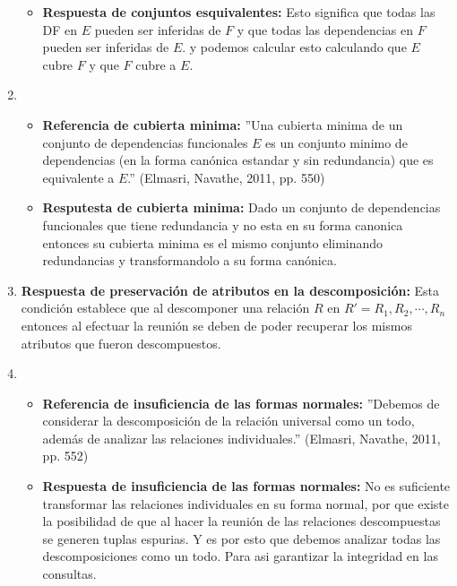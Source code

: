\documentclass[twoside]{article}
\begin{document}
\begin{enumerate}
\begin{itemize}
                  \item \textbf{Respuesta de conjuntos esquivalentes:} Esto significa que todas las DF en $E$ pueden ser inferidas de $F$ y que todas las dependencias en $F$ pueden ser
                        inferidas de $E$. y podemos calcular esto calculando que $E$ cubre $F$ y que $F$ cubre a $E$.
            \end{itemize}
      \item
            \begin{itemize}
                  \item \textbf{Referencia de cubierta minima:} ''Una cubierta minima de un conjunto de dependencias funcionales $E$ es un conjunto minimo de dependencias (en
                        la forma can\'onica estandar y sin redundancia) que es equivalente a $E$.'' (Elmasri, Navathe, 2011, pp. 550)
                  \item \textbf{Resputesta de cubierta minima:} Dado un conjunto de dependencias funcionales que tiene redundancia y no esta en su forma canonica entonces su cubierta minima
                        es el mismo conjunto eliminando redundancias y transformandolo a su forma can\'onica.
            \end{itemize}
      \item \textbf{Respuesta de preservaci\'on de atributos en la descomposici\'on:} Esta condici\'on establece que al descomponer una relaci\'on $R$ en $R' = R_1, R_2, \cdots, R_n$ entonces
            al efectuar la reuni\'on se deben de poder recuperar los mismos atributos que fueron descompuestos.
      \item
            \begin{itemize}
                  \item \textbf{Referencia de insuficiencia de las formas normales:} ''Debemos de considerar la descomposici\'on de la relaci\'on universal como un todo, adem\'as de analizar las
                        relaciones individuales.'' (Elmasri, Navathe, 2011, pp. 552)
                  \item \textbf{Respuesta de insuficiencia de las formas normales:} No es suficiente transformar las relaciones individuales en su forma normal, por que existe la posibilidad
                        de que al hacer la reuni\'on de las relaciones descompuestas se generen tuplas espurias. Y es por esto que debemos analizar todas las descomposiciones como un todo. Para
                        asi garantizar la integridad en las consultas.
            \end{itemize}
\end{enumerate}

\end{document}

